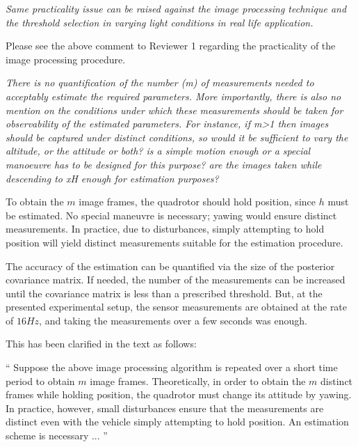 \documentclass[11pt]{article}
\newenvironment{correction}{\begin{list}{}{\setlength{\leftmargin}{1cm}\setlength{\rightmargin}{1cm}}\vspace{\parsep}\item[]``}{''\end{list}}
\begin{document}
\begin{itemize}
\item
\textit{Same practicality issue can be raised against the image processing technique and the threshold selection in varying light conditions in real life application.
}

Please see the above comment to Reviewer 1 regarding the practicality of the image processing procedure.

\item
\textit{There is no quantification of the number (m) of measurements needed to acceptably estimate the required parameters. More importantly, there is also no mention on the conditions under which these measurements should be taken for observability of the estimated parameters. For instance, if m>1 then images should be captured under distinct conditions, so would it be sufficient to vary the altitude, or the attitude or both? is a simple motion enough or a special manoeuvre has to be designed for this purpose? are the images taken while descending to xH enough for estimation purposes?
}


To obtain the $m$ image frames, the quadrotor should hold position, since $h$ must be estimated. 
No special maneuvre is necessary; yawing would ensure distinct measurements. 
In practice, due to disturbances, simply attempting to hold position will yield distinct measurements suitable for the estimation procedure. 

The accuracy of the estimation can be quantified via the size of the posterior covariance matrix. If needed, the number of the measurements can be increased until the covariance matrix is less than a prescribed threshold. But, at the presented experimental setup, the sensor measurements are obtained at the rate of $16 Hz$, and taking the measurements over a few seconds was enough.

This has been clarified in the text as follows:

\begin{correction}
Suppose the above image processing algorithm is repeated over a short time period to obtain $m$ image frames. Theoretically, in order to obtain the $m$ distinct frames while holding position, the quadrotor must change its attitude by yawing. In practice, however, small disturbances ensure that the measurements are distinct even with the vehicle simply attempting to hold position. An estimation scheme is necessary ...
\end{correction}


\end{itemize}
\end{document}

